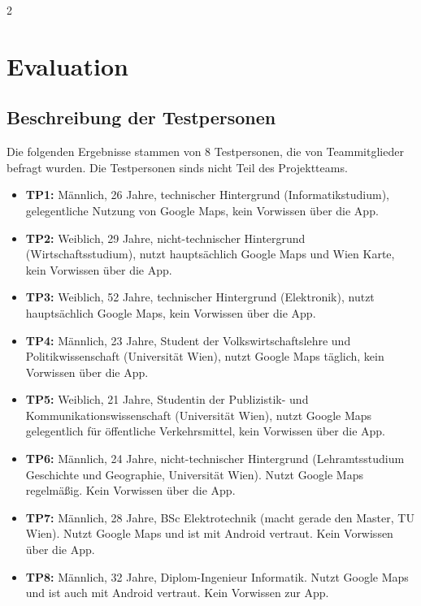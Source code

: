 \begin{multicols}{2}
\section{Evaluation}

\subsection{Beschreibung der Testpersonen}

Die folgenden Ergebnisse stammen von 8 Testpersonen, die von Teammitglieder befragt wurden.
Die Testpersonen sinds nicht Teil des Projektteams.

\begin{itemize}
  \item \textbf{TP1:} Männlich, 26 Jahre, technischer Hintergrund
        (Informatikstudium), gelegentliche Nutzung von Google Maps,
        kein Vorwissen über die App.
  \item \textbf{TP2:} Weiblich, 29 Jahre, nicht-technischer Hintergrund
        (Wirtschaftsstudium), nutzt hauptsächlich Google Maps und Wien Karte,
        kein Vorwissen über die App.
  \item \textbf{TP3:} Weiblich, 52 Jahre, technischer Hintergrund (Elektronik), nutzt hauptsächlich Google  Maps, kein Vorwissen über die App. 
  \item \textbf{TP4:} Männlich, 23 Jahre, Student der Volkswirtschaftslehre und
        Politikwissenschaft (Universität Wien), nutzt Google Maps täglich,
        kein Vorwissen über die App.
  \item \textbf{TP5:} Weiblich, 21 Jahre, Studentin der Publizistik- und
        Kommunikationswissenschaft (Universität Wien), nutzt Google Maps
        gelegentlich für öffentliche Verkehrsmittel, kein Vorwissen über die App.
      \item \textbf{TP6:} Männlich, 24 Jahre, nicht-technischer Hintergrund
(Lehramtsstudium Geschichte und Geographie, Universität Wien).
Nutzt Google Maps regelmäßig.
Kein Vorwissen über die App.
\item \textbf{TP7:} Männlich, 28 Jahre, BSc Elektrotechnik (macht gerade den Master, TU Wien). Nutzt Google Maps und ist mit Android vertraut. Kein Vorwissen über die App.
\item \textbf{TP8:} Männlich, 32 Jahre, Diplom-Ingenieur Informatik. Nutzt Google Maps und ist auch mit Android vertraut. Kein Vorwissen zur App.
\end{itemize}
\end{multicols}

